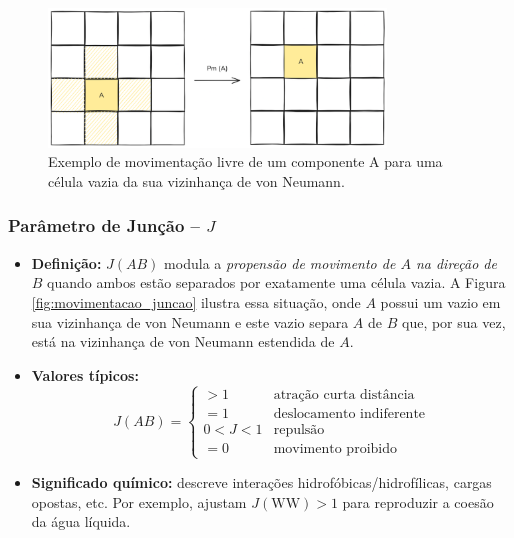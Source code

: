 \documentclass[12pt,oneside]{report}
\begin{document}
\begin{figure}[H]
    \centering
    \includegraphics[width=0.8\textwidth]{img/Pm.png}
    \caption{\small Exemplo de movimentação livre de um componente A para uma célula vazia da sua vizinhança de von Neumann.}
    \label{fig:movimentacao_livre}
\end{figure}

\subsubsection{Parâmetro de Junção – \texorpdfstring{$J$}{J}}
\label{subsubsec:J}

\begin{itemize}
    \item \textbf{Definição:} $J(AB)$ modula a
          \emph{propensão de movimento de $A$ na direção de $B$}
          quando ambos estão separados por exatamente uma célula vazia. A Figura \ref{fig:movimentacao_juncao} ilustra essa situação, onde $A$ possui um vazio em sua vizinhança de von Neumann e este vazio separa $A$ de $B$ que, por sua vez, está na vizinhança de von Neumann estendida de $A$.
    \item \textbf{Valores típicos:}
          \[
              J(AB)=
              \begin{cases}
                  >1    & \text{atração curta distância}  \\[2pt]
                  =1    & \text{deslocamento indiferente} \\[2pt]
                  0<J<1 & \text{repulsão}                 \\[2pt]
                  =0    & \text{movimento proibido}
              \end{cases}
          \]
    \item \textbf{Significado químico:} descreve interações
          hidrofóbicas/hidrofílicas, cargas opostas, etc.
          Por exemplo, \citeauthor{kier2005} ajustam
          $J(\mathrm{WW})>1$ para reproduzir a coesão da água líquida.
\end{itemize}
\end{document}
